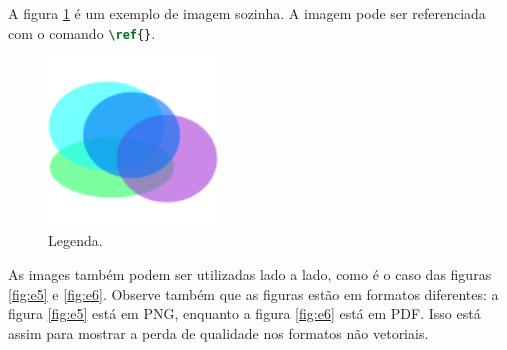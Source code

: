     A figura \ref{fig:e4} é um exemplo de imagem sozinha.
    A imagem pode ser referenciada com o comando \lstinline[language=TeX, style=Code]|\ref{}|.


    \begin{figure}[htb]
        \centering
        \includegraphics[width=0.4\textwidth]{images/figure.png}
        \caption{Legenda.}
        \label{fig:e4}
    \end{figure}

    As images também podem ser utilizadas lado a lado, como é o caso das figuras \ref{fig:e5} e \ref{fig:e6}.
    Observe também que as figuras estão em formatos diferentes: a figura \ref{fig:e5} está em PNG, enquanto a figura \ref{fig:e6} está em PDF.
    Isso está assim para mostrar a perda de qualidade nos formatos não vetoriais.



